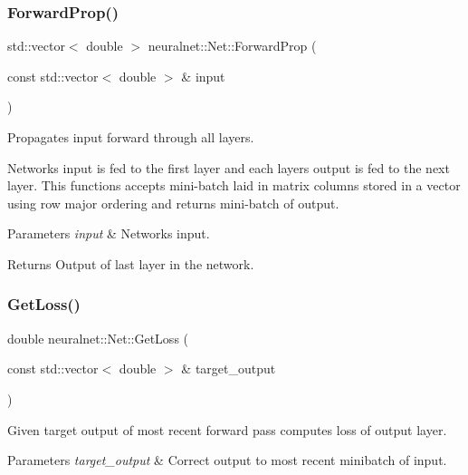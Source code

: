 \subsubsection{\texorpdfstring{Forward\+Prop()}{ForwardProp()}}
{\footnotesize\ttfamily std\+::vector$<$ double $>$ neuralnet\+::\+Net\+::\+Forward\+Prop (\begin{DoxyParamCaption}\item[{const std\+::vector$<$ double $>$ \&}]{input }\end{DoxyParamCaption})\hspace{0.3cm}{\ttfamily [virtual]}}



Propagates input forward through all layers. 

Network\textquotesingle{}s input is fed to the first layer and each layer\textquotesingle{}s output is fed to the next layer. This functions accepts mini-\/batch laid in matrix columns stored in a vector using row major ordering and returns mini-\/batch of output.


\begin{DoxyParams}{Parameters}
{\em input} & Network\textquotesingle{}s input. \\
\hline
\end{DoxyParams}
\begin{DoxyReturn}{Returns}
Output of last layer in the network. 
\end{DoxyReturn}
\mbox{\label{classneuralnet_1_1Net_a0b2faa9eb2faffdaf01ed8b5318fe069}} 
\subsubsection{\texorpdfstring{Get\+Loss()}{GetLoss()}}
{\footnotesize\ttfamily double neuralnet\+::\+Net\+::\+Get\+Loss (\begin{DoxyParamCaption}\item[{const std\+::vector$<$ double $>$ \&}]{target\+\_\+output }\end{DoxyParamCaption})}



Given target output of most recent forward pass computes loss of output layer. 


\begin{DoxyParams}{Parameters}
{\em target\+\_\+output} & Correct output to most recent minibatch of input. \\
\hline
\end{DoxyParams}
\mbox{\label{classneuralnet_1_1Net_a541fcd626459752b0de09a2a150f3d2a}} 
